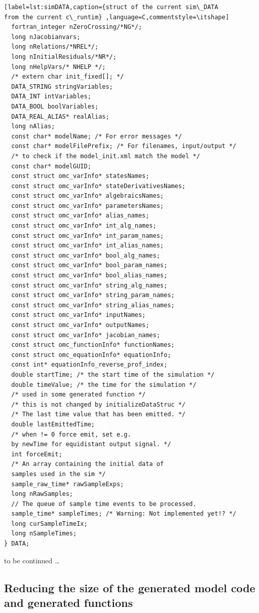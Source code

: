 \begin{lstlisting}[label=lst:simDATA,caption={struct of the current sim\_DATA
from the current c\_runtim} ,language=C,commentstyle=\itshape]
  fortran_integer nZeroCrossing/*NG*/;
  long nJacobianvars;
  long nRelations/*NREL*/;
  long nInitialResiduals/*NR*/;
  long nHelpVars/* NHELP */;
  /* extern char init_fixed[]; */
  DATA_STRING stringVariables;
  DATA_INT intVariables;
  DATA_BOOL boolVariables;
  DATA_REAL_ALIAS* realAlias;
  long nAlias;
  const char* modelName; /* For error messages */
  const char* modelFilePrefix; /* For filenames, input/output */
  /* to check if the model_init.xml match the model */
  const char* modelGUID; 
  const struct omc_varInfo* statesNames;
  const struct omc_varInfo* stateDerivativesNames;
  const struct omc_varInfo* algebraicsNames;
  const struct omc_varInfo* parametersNames;
  const struct omc_varInfo* alias_names;
  const struct omc_varInfo* int_alg_names;
  const struct omc_varInfo* int_param_names;
  const struct omc_varInfo* int_alias_names;
  const struct omc_varInfo* bool_alg_names;
  const struct omc_varInfo* bool_param_names;
  const struct omc_varInfo* bool_alias_names;
  const struct omc_varInfo* string_alg_names;
  const struct omc_varInfo* string_param_names;
  const struct omc_varInfo* string_alias_names;
  const struct omc_varInfo* inputNames;
  const struct omc_varInfo* outputNames;
  const struct omc_varInfo* jacobian_names;
  const struct omc_functionInfo* functionNames;
  const struct omc_equationInfo* equationInfo;
  const int* equationInfo_reverse_prof_index;
  double startTime; /* the start time of the simulation */
  double timeValue; /* the time for the simulation */
  /* used in some generated function */
  /* this is not changed by initializeDataStruc */
  /* The last time value that has been emitted. */
  double lastEmittedTime; 
  /* when != 0 force emit, set e.g. 
  by newTime for equidistant output signal. */
  int forceEmit; 
  /* An array containing the initial data of 
  samples used in the sim */
  sample_raw_time* rawSampleExps;
  long nRawSamples;
  // The queue of sample time events to be processed.
  sample_time* sampleTimes; /* Warning: Not implemented yet!? */
  long curSampleTimeIx;
  long nSampleTimes;
} DATA;
\end{lstlisting}

to be continued \ldots

\subsection{Reducing the size of the generated model code and generated
functions}\label{sec:ReduceSize}

